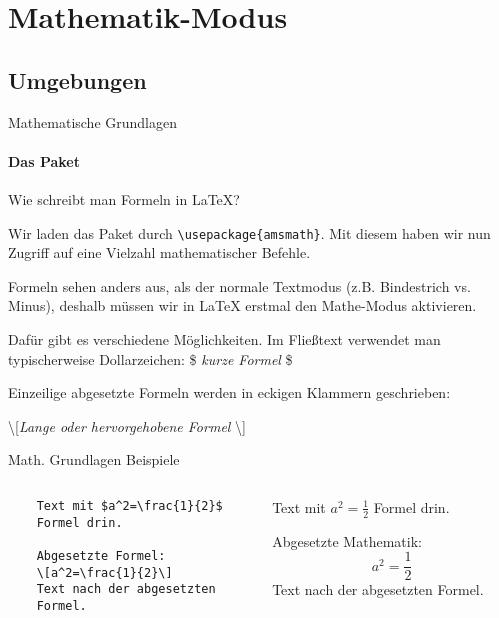 \section{Mathematik-Modus}
\subsection{Umgebungen}
\begin{frame}[fragile]{Mathematische Grundlagen}
\framesubtitle{Das Paket }
Wie schreibt man Formeln in \LaTeX{}?

\medskip\pause
Wir laden das Paket  durch \verb+\usepackage{amsmath}+. Mit diesem haben wir nun Zugriff auf eine Vielzahl mathematischer Befehle.

\medskip\pause
Formeln sehen anders aus, als der normale Textmodus (z.B. Bindestrich vs. Minus), deshalb müssen wir in \LaTeX{} erstmal den Mathe-Modus aktivieren.

\medskip\pause
Dafür gibt es verschiedene Möglichkeiten. Im Fließtext verwendet man typischerweise Dollarzeichen: \$ \emph{kurze Formel} \$

Einzeilige abgesetzte Formeln werden in eckigen Klammern geschrieben: 
\begin{center}
\textbackslash[\emph{Lange oder hervorgehobene Formel} \textbackslash]
\end{center}
\end{frame}

\begin{frame}[fragile]{Math. Grundlagen Beispiele}
\begin{columns}
\begin{column}{.48\textwidth}\footnotesize
\begin{codeblock}
\begin{verbatim}
	Text mit $a^2=\frac{1}{2}$
	Formel drin.

	Abgesetzte Formel:
	\[a^2=\frac{1}{2}\]
	Text nach der abgesetzten
	Formel.
\end{verbatim}
\end{codeblock}
\end{column}
%
\begin{column}{.45\textwidth}	\pause	
	Text mit $a^2=\frac{1}{2}$ Formel drin.
    
    \pause
	Abgesetzte Mathematik:
	\[a^2=\frac{1}{2}\]
	Text nach der abgesetzten Formel.
\end{column}
\end{columns}
\end{frame}





